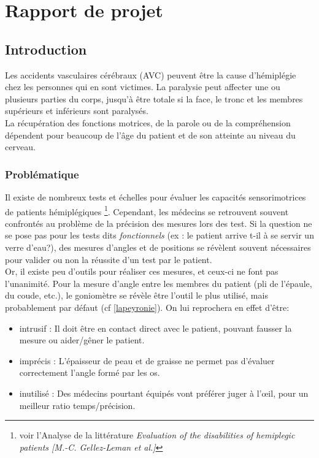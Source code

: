 \documentclass[french,12pt]{report}
\begin{document}
\part{Rapport de projet}
\newpage
	\chapter{Introduction}
Les accidents vasculaires cérébraux (AVC) peuvent être la cause d'hémiplégie chez les personnes qui en sont victimes. La paralysie peut affecter une ou plusieurs parties du corps, jusqu'à être totale si la face, le tronc et les membres supérieurs et inférieurs sont paralysés. \\
La récupération des fonctions motrices, de la parole ou de la compréhension dépendent pour beaucoup de l'âge du patient et de son atteinte au niveau du cerveau.
		\section{Problématique}
Il existe de nombreux tests et échelles pour évaluer les capacités sensorimotrices de patients hémiplégiques \footnote{voir l'Analyse de la littérature \textit{Evaluation of the disabilities of hemiplegic patients [M.-C. Gellez-Leman et al.]}}. Cependant, les médecins se retrouvent souvent confrontés au problème de la précision des mesures lors des test. Si la question ne se pose pas pour les tests dits \textit{fonctionnels} (ex : le patient arrive t-il à se servir un verre d'eau?), des mesures d'angles et de positions se révèlent souvent nécessaires pour valider ou non la réussite d'un test par le patient.
\\Or, il existe peu d'outils pour réaliser ces mesures, et ceux-ci ne font pas l'unanimité. Pour la mesure d'angle entre les membres du patient (pli de l'épaule, du coude, etc.), le goniomètre se révèle être l'outil le plus utilisé, mais probablement par défaut (cf \ref{lapeyronie}). On lui reprochera en effet d'être: 
\begin{itemize}
	\item {intrusif :} Il doit être en contact direct avec le patient, pouvant fausser la mesure ou aider/gêner le patient.
	\item {imprécis :} L'épaisseur de peau et de graisse ne permet pas d'évaluer correctement l'angle formé par les os.
	\item {inutilisé :} Des médecins pourtant équipés vont préférer juger à l'œil, pour un meilleur ratio temps/précision.
\end{itemize}
\end{document}
